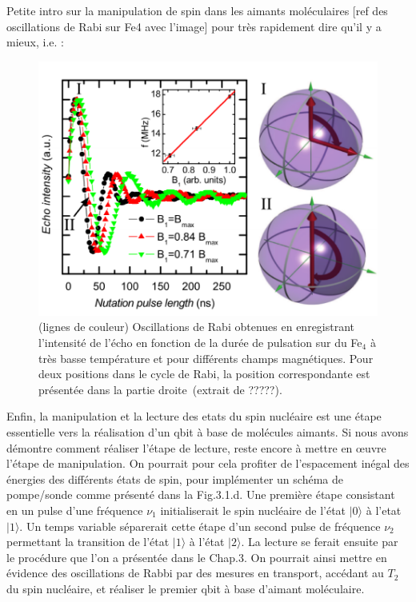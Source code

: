 Petite intro sur la manipulation de spin dans les aimants moléculaires [ref des oscillations de Rabi sur Fe4 avec l'image] pour très rapidement dire qu'il y a mieux, i.e. :


\begin{figure}[h!]
\parbox{7cm}{
\includegraphics[scale=0.45]{Conclusion/OscilFe4/OscilFe4.pdf} 
}
\parbox{6.5cm}{\caption{(lignes de couleur) Oscillations de Rabi obtenues en enregistrant l'intensité de l'écho en fonction de la durée de pulsation sur du Fe$_4$ à très basse température et pour différents champs magnétiques. Pour deux positions dans le cycle de Rabi, la position correspondante est présentée dans la partie droite~(extrait de ?????).}
\label{OscilFe4}
}
\end{figure}


Enfin, la manipulation et la lecture des etats du spin nucléaire est une étape essentielle vers la réalisation d'un qbit à base de molécules aimants. Si nous avons démontre comment réaliser l’étape de lecture, reste encore à mettre en œuvre l’étape de manipulation. On pourrait pour cela profiter de l'espacement inégal des énergies des différents états de spin, pour implémenter un schéma de pompe/sonde comme présenté dans la Fig.3.1.d. Une première étape consistant en un pulse d'une fréquence $\nu_1$ initialiserait le spin nucléaire de l’état $|0\rangle$ à l'etat $|1\rangle$. Un temps variable séparerait cette étape d'un second pulse de fréquence $\nu_2$ permettant la transition de l’état $|1\rangle$ à l’état $|2\rangle$. La lecture se ferait ensuite par le procédure que l'on a présentée dans le Chap.3. On pourrait ainsi mettre en évidence des oscillations de Rabbi par des mesures en transport, accédant au $T_2$ du spin nucléaire, et réaliser le premier qbit à base d'aimant moléculaire.

